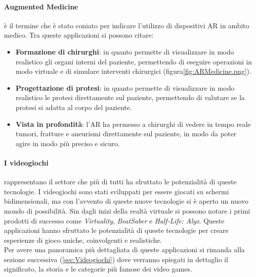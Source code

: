         \paragraph{Augmented Medicine} è il termine che è stato coniato per indicare l'utilizzo di dispositivi AR in ambito medico. Tra queste applicazioni si possono citare:
            \begin{itemize}
                \item \textbf{Formazione di chirurghi}: in quanto permette di visualizzare in modo realistico gli organi 
                    interni del paziente, permettendo di eseguire operazioni in modo virtuale e di simulare interventi chirurgici (figura\ref{fig:ARMedicine.png}).
                \item \textbf{Progettazione di protesi}: in quanto permette di visualizzare in modo realistico le protesi 
                    direttamente sul paziente, permettendo di valutare se la protesi si adatta al corpo del paziente.
                \item \textbf{Vista in profondità}: l'AR ha permesso a chirurghi di vedere in tempo reale tumori, fratture e aneurismi direttamente sul paziente, in modo da poter 
                    agire in modo più preciso e sicuro.
            \end{itemize}

        \paragraph{I videogiochi} rappresentano il settore che più di tutti ha sfruttato le potenzialità di queste tecnologie. I videogiochi sono stati sviluppati per essere giocati 
            su schermi bidimensionali, ma con l'avvento di queste nuove tecnologie si è aperto un nuovo mondo di possibilità. Sin dagli inizi della realtà virtuale si possono notare
            i primi prodotti di successo come \textit{Virtuality}, \textit{BeatSaber} e \textit{Half-Life: Alyx}. Queste applicazioni hanno sfruttato le potenzialità di queste
            tecnologie per creare esperienze di gioco uniche, coinvolgenti e realistiche.\\
            Per avere una panoramica più dettagliata di queste applicazioni si rimanda alla sezione successiva (\ref{sec:Videogiochi}) dove verranno spiegati in dettaglio
            il significato, la storia e le categorie più famose dei video games.

